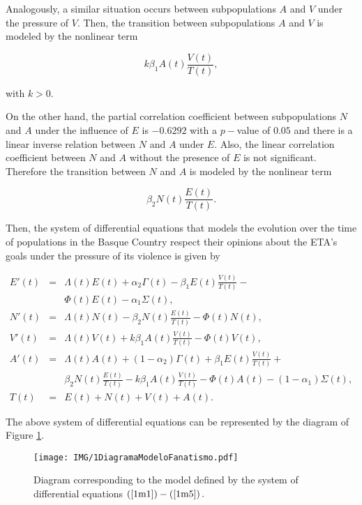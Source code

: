 Analogously, a similar situation occurs between subpopulations $A$ and $V$
under the pressure of $V$. Then, the transition between subpopulations $A$
and $V$ is modeled by the nonlinear term

\[
k \beta_{1} A(t) \frac{V(t)}{T(t)}, 
\]

with $k > 0$.

On the other hand, the partial correlation coefficient between
subpopulations $N$ and $A$ under the influence of $E$ is $-0.6292$ with a 
$p- $value of $0.05$ and there is a linear inverse relation between $N$ and 
$A $ under $E$. Also, the linear correlation coefficient between $N$ and $A$
without the presence of $E$ is not significant. Therefore the transition
between $N$ and $A$ is modeled by the nonlinear term

\[
\beta_{2} N(t) \frac{E(t)}{T(t)}. 
\]

Then, the system of differential equations that models the evolution over the time of populations in the Basque Country respect their opinions about the ETA's goals under the pressure of its violence is given by

\begin{eqnarray}
E'(t)	& = &	\Lambda(t) E(t) + \alpha_{2} \Gamma(t) - \beta_{1} E(t) \frac{V(t)}{T(t)} - \label{1m1} \\
        &   &	\Phi(t) E(t) - \alpha_{1} \Sigma(t),  \nonumber \\                          
N'(t)	& = &	\Lambda(t) N(t) - \beta_{2} N(t) \frac{E(t)}{T(t)} - \Phi(t) N(t),  \label{1m2} \\
V'(t)	& = &	\Lambda(t) V(t) + k \beta_{1} A(t) \frac{V(t)}{T(t)} - \Phi(t) V(t),  \label{1m3} \\
A'(t)	& = &  	\Lambda(t) A(t) + (1 - \alpha_{2}) \Gamma(t) + \beta_{1} E(t) \frac{V(t)}{T(t)} + \label{1m4} \\
		&   &	\beta_{2}N(t) \frac{E(t)}{T(t)} - k \beta_{1} A(t) \frac{V(t)}{T(t)} - \Phi(t) A(t) - 
		        (1 - \alpha_{1}) \Sigma(t),  \nonumber \\
T(t)		& = &	E(t) + N(t) + V(t) + A(t).  \label{1m5}
\end{eqnarray}

The above system of differential equations can be represented by the diagram of Figure \ref{1diagrama}.

\begin{figure}[htb]
\begin{center}
\texttt{[image: IMG/1DiagramaModeloFanatismo.pdf]}
\end{center}
\caption{Diagram corresponding to the model defined by the system of 
differential equations $\left( \protect\ref{1m1}\right) -\left( \protect\ref{1m5}\right).$}
\label{1diagrama}
\end{figure}

